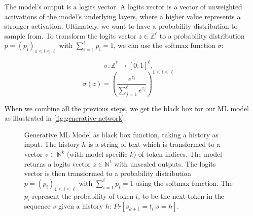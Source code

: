 The model's output is a logits vector.
A logits vector is a vector of unweighted activations of the model's underlying layers, where a higher value represents a stronger activation.
Ultimately, we want to have a probability distribution to sample from.
To transform the logits vector $z \in \mathbb{Z}^\ell$ to a probability distribution $p = (p_i)_{1 \leq i \leq \ell}$ with $\sum_{i=1}^{\ell} p_i = 1$, we can use the softmax function $\sigma$:

$$\sigma \colon \mathbb{Z}^{\ell} \rightarrow [0,1]^{\ell},$$
$$\sigma(z) = \left(\frac{e^{z_i}}{\sum_{j=1}^{\ell} e^{z_j}}\right)^{1 \leq i \leq \ell}$$

When we combine all the previous steps, we get the black box for our ML model as illustrated in \autoref{fig:generative-network}.

\begin{figure}[htpb]
	\centering
	\caption{
Generative ML Model as black box function, taking a history as input.
The history $h$ is a string of text which is transformed to a vector $v \in \mathbb{N}^k$ (with model-specific $k$) of token indices.
The model returns a logits vector $z \in \mathbb{N}^{\ell}$ with unscaled outputs.
The logits vector is then transformed to a probability distribution $p = \left(p_i\right)_{1 \leq i \leq \ell}$ with $\sum_{i=1}^{\ell} p_i = 1$ using the softmax function.
	The $p_i$ represent the probability of token $t_i$ to be the next token in the sequence $s$ given a history $h$: $Pr[s_{k+1}=t_i|s=h]$.
}
	\label{fig:generative-network}
\end{figure}

